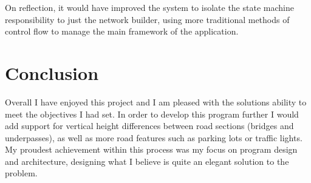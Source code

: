         On reflection, it would have improved the system to isolate the state machine responsibility to just the network builder, using more traditional methods of control flow to manage the main framework of the application.

\section{Conclusion}

    Overall I have enjoyed this project and I am pleased with the solutions ability to meet the objectives I had set. In order to develop this program further I would add support for vertical height differences between road sections (bridges and underpasses), as well as more road features such as parking lots or traffic lights. My proudest achievement within this process was my focus on program design and architecture, designing what I believe is quite an elegant solution to the problem.